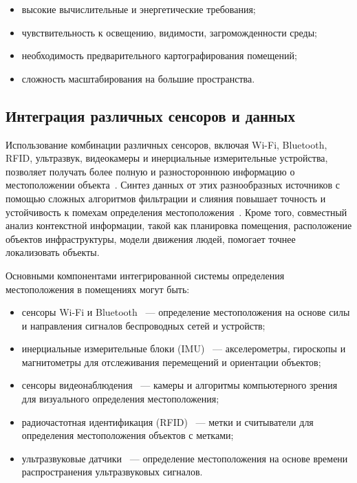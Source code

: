 \begin{itemize}[label=---]
    \item высокие вычислительные и энергетические требования;
    \item чувствительность к освещению, видимости, загроможденности среды;
    \item необходимость предварительного картографирования помещений;
    \item сложность масштабирования на большие пространства.
\end{itemize}

\subsection{Интеграция различных сенсоров и данных}

Использование комбинации различных сенсоров, включая Wi-Fi, Bluetooth, RFID, ультразвук, видеокамеры и инерциальные измерительные устройства, позволяет получать более полную и разностороннюю информацию о местоположении объекта~\cite{multsensors}. Синтез данных от этих разнообразных источников с помощью сложных алгоритмов фильтрации и слияния повышает точность и устойчивость к помехам определения местоположения~\cite{trends}. Кроме того, совместный анализ контекстной информации, такой как планировка помещения, расположение объектов инфраструктуры, модели движения людей, помогает точнее локализовать объекты.

Основными компонентами интегрированной системы определения местоположения в помещениях могут быть:

\begin{itemize}[label=---]
    \item сенсоры Wi-Fi и Bluetooth~\cite{blwifi} --- определение местоположения на основе силы и направления сигналов беспроводных сетей и устройств;
    \item инерциальные измерительные блоки (IMU)~\cite{imu} --- акселерометры, гироскопы и магнитометры для отслеживания перемещений и ориентации объектов;
    \item сенсоры видеонаблюдения~\cite{compvision} --- камеры и алгоритмы компьютерного зрения для визуального определения местоположения;
    \item радиочастотная идентификация (RFID)~\cite{basebook} --- метки и считыватели для определения местоположения объектов с метками;
    \item ультразвуковые датчики~\cite{shielding} --- определение местоположения на основе времени распространения ультразвуковых сигналов.
\end{itemize}

